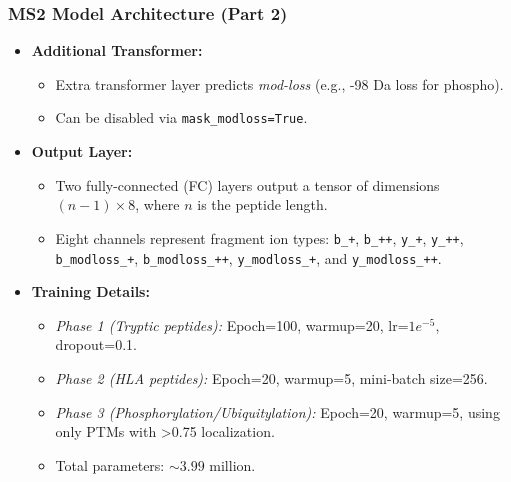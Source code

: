 \documentclass{beamer}
\begin{document}
\begin{frame}
  \frametitle{MS2 Model Architecture (Part 2)}
  \begin{itemize}
    \item \textbf{Additional Transformer:}
      \begin{itemize}
        \item Extra transformer layer predicts \textit{mod-loss} (e.g., -98 Da loss for phospho).
        \item Can be disabled via \texttt{mask\_modloss=True}.
      \end{itemize}
    \item \textbf{Output Layer:}
      \begin{itemize}
        \item Two fully-connected (FC) layers output a tensor of dimensions $(n-1) \times 8$, where $n$ is the peptide length.
        \item Eight channels represent fragment ion types: \texttt{b\_+}, \texttt{b\_++}, \texttt{y\_+}, \texttt{y\_++}, \texttt{b\_modloss\_+}, \texttt{b\_modloss\_++}, \texttt{y\_modloss\_+}, and \texttt{y\_modloss\_++}.
      \end{itemize}
    \item \textbf{Training Details:}
      \begin{itemize}
        \item \textit{Phase 1 (Tryptic peptides):} Epoch=100, warmup=20, lr=$1e^{-5}$, dropout=0.1.
        \item \textit{Phase 2 (HLA peptides):} Epoch=20, warmup=5, mini-batch size=256.
        \item \textit{Phase 3 (Phosphorylation/Ubiquitylation):} Epoch=20, warmup=5, using only PTMs with >0.75 localization.
        \item Total parameters: $\sim3.99$ million.
      \end{itemize}
  \end{itemize}
\end{frame}
\end{document}
